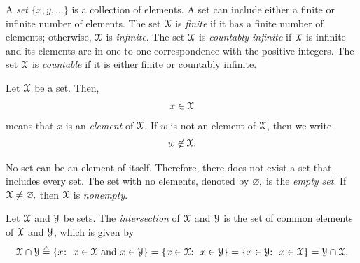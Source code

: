 

A {\it set} $\{x,y,\ldots\}$ is a collection of elements.
A set can include either a finite or infinite number of elements.
The set ${\mathcal X}$ is {\it finite} if it has a finite number of elements; otherwise, ${\mathcal X}$ is {\it infinite}.
%
The set ${\mathcal X}$ is {\it countably infinite} if ${\mathcal X}$ is infinite and its elements are in one-to-one correspondence with the positive integers. The set ${\mathcal X}$ is {\it countable} if it is either finite or countably infinite.

Let ${\mathcal X}$ be a set.
Then, \begin{align}x\in {\mathcal X}\end{align} means that $x$ is an {\it element}
\label{insym}%
%
of ${\mathcal X}$. If $w$ is not an element of ${\mathcal X}$, then we write
\begin{align}w\not\in {\mathcal X}.\end{align}
\label{notinsym}

No set can be an element of itself.  Therefore, there does not exist a set that includes every set.  The set with no elements, denoted by $\varnothing\mspace{-1mu},$ is the {\it empty set}.
%
\label{varnothingsym}%
%
%
If ${\mathcal X}\not=\varnothing\mspace{-1mu},$ then ${\mathcal X}$ is {\it nonempty}.

Let ${\mathcal X}$ and ${\mathcal Y}$ be sets. The {\it intersection}
%
of ${\mathcal X}$ and ${\mathcal Y}$ is the set of common elements of ${\mathcal X}$ and
${\mathcal Y}$, which is given by
\begin{align}
\SX\cap \SY
%
\isdef\{x\mspace{-1mu}\colon\ x\in \SX \mbox{ and } x\in \SY \}
%
=  \{ x\in \SX \mspace{-2mu}\colon\ x\in \SY \}
%
=\{x\in \SY\mspace{-2mu}\colon\ x\in \SX \}
%
= \SY \cap \SX,\end{align}

